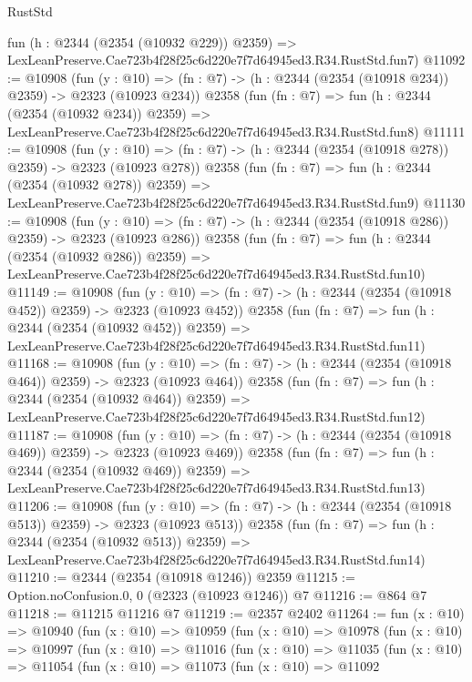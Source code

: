 \begin{lexlean}{RustStd}
\begin{coremodule}
    fun (h : @2344 (@2354 (@10932 @229)) @2359) =>
    LexLeanPreserve.Cae723b4f28f25c6d220e7f7d64945ed3.R34.RustStd.fun7)
@11092 := @10908
    (fun (y : @10) => (fn : @7) -> (h : @2344 (@2354 (@10918 @234)) @2359) -> @2323 (@10923 @234))
    @2358
    (fun (fn : @7) =>
    fun (h : @2344 (@2354 (@10932 @234)) @2359) =>
    LexLeanPreserve.Cae723b4f28f25c6d220e7f7d64945ed3.R34.RustStd.fun8)
@11111 := @10908
    (fun (y : @10) => (fn : @7) -> (h : @2344 (@2354 (@10918 @278)) @2359) -> @2323 (@10923 @278))
    @2358
    (fun (fn : @7) =>
    fun (h : @2344 (@2354 (@10932 @278)) @2359) =>
    LexLeanPreserve.Cae723b4f28f25c6d220e7f7d64945ed3.R34.RustStd.fun9)
@11130 := @10908
    (fun (y : @10) => (fn : @7) -> (h : @2344 (@2354 (@10918 @286)) @2359) -> @2323 (@10923 @286))
    @2358
    (fun (fn : @7) =>
    fun (h : @2344 (@2354 (@10932 @286)) @2359) =>
    LexLeanPreserve.Cae723b4f28f25c6d220e7f7d64945ed3.R34.RustStd.fun10)
@11149 := @10908
    (fun (y : @10) => (fn : @7) -> (h : @2344 (@2354 (@10918 @452)) @2359) -> @2323 (@10923 @452))
    @2358
    (fun (fn : @7) =>
    fun (h : @2344 (@2354 (@10932 @452)) @2359) =>
    LexLeanPreserve.Cae723b4f28f25c6d220e7f7d64945ed3.R34.RustStd.fun11)
@11168 := @10908
    (fun (y : @10) => (fn : @7) -> (h : @2344 (@2354 (@10918 @464)) @2359) -> @2323 (@10923 @464))
    @2358
    (fun (fn : @7) =>
    fun (h : @2344 (@2354 (@10932 @464)) @2359) =>
    LexLeanPreserve.Cae723b4f28f25c6d220e7f7d64945ed3.R34.RustStd.fun12)
@11187 := @10908
    (fun (y : @10) => (fn : @7) -> (h : @2344 (@2354 (@10918 @469)) @2359) -> @2323 (@10923 @469))
    @2358
    (fun (fn : @7) =>
    fun (h : @2344 (@2354 (@10932 @469)) @2359) =>
    LexLeanPreserve.Cae723b4f28f25c6d220e7f7d64945ed3.R34.RustStd.fun13)
@11206 := @10908
    (fun (y : @10) => (fn : @7) -> (h : @2344 (@2354 (@10918 @513)) @2359) -> @2323 (@10923 @513))
    @2358
    (fun (fn : @7) =>
    fun (h : @2344 (@2354 (@10932 @513)) @2359) =>
    LexLeanPreserve.Cae723b4f28f25c6d220e7f7d64945ed3.R34.RustStd.fun14)
@11210 := @2344 (@2354 (@10918 @1246)) @2359
@11215 := Option.noConfusion.{0, 0} (@2323 (@10923 @1246)) @7
@11216 := @864 @7
@11218 := @11215 @11216 @7
@11219 := @2357 @2402
@11264 := fun (x : @10) =>
  @10940
    (fun (x : @10) =>
    @10959
      (fun (x : @10) =>
      @10978
        (fun (x : @10) =>
        @10997
          (fun (x : @10) =>
          @11016
            (fun (x : @10) =>
            @11035
              (fun (x : @10) =>
              @11054
                (fun (x : @10) =>
                @11073
                  (fun (x : @10) =>
                  @11092

\end{coremodule}
\end{lexlean}
